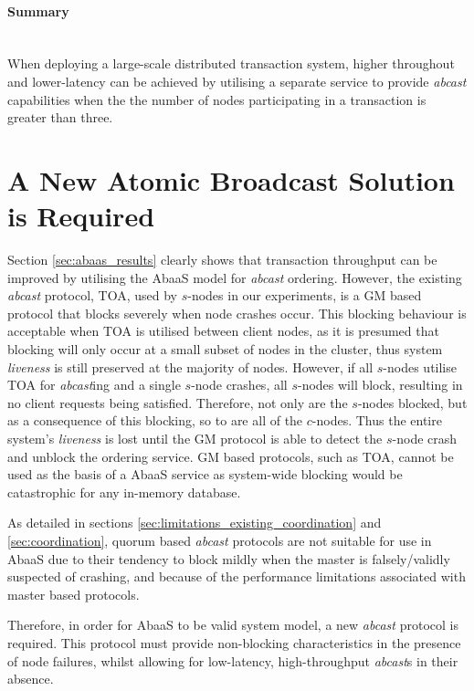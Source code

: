 \paragraph{Summary} \hspace{0pt} \\
When deploying a large-scale distributed transaction system, higher throughout and lower-latency can be achieved by utilising a separate service to provide \emph{abcast} capabilities when the the number of nodes participating in a transaction is greater than three.  

\section{A New Atomic Broadcast Solution is Required}
Section \ref{sec:abaas_results} clearly shows that transaction throughput can be improved by utilising the \textsf{AbaaS} model for \emph{abcast} ordering.  However, the existing \emph{abcast} protocol, TOA,  used by $s$-nodes in our experiments, is a GM based protocol that blocks severely when node crashes occur.  This blocking behaviour is acceptable when TOA is utilised between client nodes, as it is presumed that blocking will only occur at a small subset of nodes in the cluster, thus system \emph{liveness} is still preserved at the majority of nodes.  However, if all $s$-nodes utilise TOA for \emph{abcast}ing and a single $s$-node crashes, all $s$-nodes will block, resulting in no client requests being satisfied. Therefore, not only are the $s$-nodes blocked, but as a consequence of this blocking, so to are all of the $c$-nodes.  Thus the entire system's \emph{liveness} is lost until the GM protocol is able to detect the $s$-node crash and unblock the ordering service.  GM based protocols, such as TOA, cannot be used as the basis of a \textsf{AbaaS} service as system-wide blocking would be catastrophic for any in-memory database.  

As detailed in sections \ref{sec:limitations_existing_coordination} and \ref{sec:coordination}, quorum based \emph{abcast} protocols are not suitable for use in \textsf{AbaaS} due to their tendency to block mildly when the master is falsely/validly suspected of crashing, and because of the performance limitations associated with master based protocols.  

Therefore, in order for \textsf{AbaaS} to be valid system model, a new \emph{abcast} protocol is required.  This protocol must provide non-blocking characteristics in the presence of node failures, whilst allowing for low-latency, high-throughput \emph{abcast}s in their absence.  

